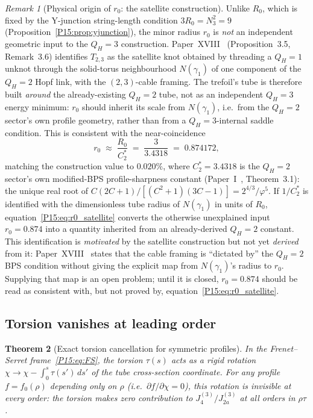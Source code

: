 \documentclass[11pt,a4paper]{article}
\newtheorem{theorem}{Theorem}[section]
\theoremstyle{definition}\newtheorem{definition}[theorem]{Definition}
\theoremstyle{remark}
\newtheorem{remark}[theorem]{Remark}
\newcommand{\vp}{\varphi}
\newcommand{\QH}{Q_H}
\begin{document}
\begin{remark}[Physical origin of $r_0$: the satellite construction]
\label{P15:rem:r0_origin}
Unlike $R_0$, which is fixed by the Y-junction string-length
condition $3R_0=N_3^2=9$ (Proposition~\ref{P15:prop:yjunction}), the
minor radius $r_0$ is \emph{not} an independent geometric input to
the $\QH=3$ construction.  Paper~XVIII~\cite{Paper18}
(Proposition~3.5, %
Remark~3.6) identifies $T_{2,3}$ as the satellite knot obtained by threading a
$\QH=1$ unknot through the solid-torus neighbourhood $N(\gamma_1)$ of
one component of the $\QH=2$ Hopf link, with the $(2,3)$-cable
framing.  The trefoil's tube is therefore built \emph{around} the
already-existing $\QH=2$ tube, not as an independent $\QH=3$ energy
minimum: $r_0$ should inherit its scale from $N(\gamma_1)$, i.e.\
from the $\QH=2$ sector's own profile geometry, rather than from a
$\QH=3$-internal saddle condition.  This is consistent with the
near-coincidence
\begin{equation}
  r_0 \;\approx\; \frac{R_0}{C_2^*} \;=\; \frac{3}{3.4318} \;=\; 0.874172,
  \label{P15:eq:r0_satellite}
\end{equation}
matching the construction value to $0.020\%$, where $C_2^*=3.4318$
is the $\QH=2$ sector's own modified-BPS profile-sharpness constant
(Paper~I~\cite{Paper1}, Theorem~3.1): the unique real root of
$C(2C+1)/[(C^2+1)(3C-1)]=2^{4/3}/\vp^5$.  If $1/C_2^*$ is identified
with the dimensionless tube radius of $N(\gamma_1)$ in units of
$R_0$, equation~\eqref{P15:eq:r0_satellite} converts the otherwise
unexplained input $r_0=0.874$ into a quantity inherited from an
already-derived $\QH=2$ constant.  This identification is
\emph{motivated} by the satellite construction but not yet
\emph{derived} from it: Paper~XVIII~\cite{Paper18} states that the cable framing is
``dictated by'' the $\QH=2$ BPS condition without giving the explicit
map from $N(\gamma_1)$'s radius to $r_0$.  Supplying that map is an
open problem; until it is closed, $r_0=0.874$ should be read as
consistent with, but not proved by, equation~\eqref{P15:eq:r0_satellite}.
\end{remark}

\subsection{Torsion vanishes at leading order}

\begin{theorem}[Exact torsion cancellation for symmetric profiles]
\label{P15:thm:torsion_cancels}
In the Frenet--Serret frame~\eqref{P15:eq:FS}, the torsion $\tau(s)$
acts as a rigid rotation $\chi\to\chi-\int_0^s\tau(s')\,ds'$ of the
tube cross-section coordinate.
For any profile $f=f_0(\rho)$ depending only on $\rho$
(i.e.\ $\partial f/\partial\chi=0$), this rotation
is invisible at \emph{every order}: the torsion makes
zero contribution to $J_4^{(3)}/J_{2a}^{(3)}$ at all orders in $\rho\tau$.
\end{theorem}
\end{document}
